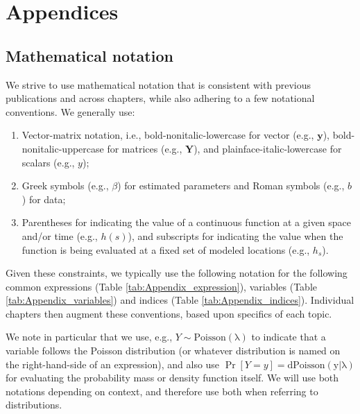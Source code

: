 \chapter{Appendices}

\section{Mathematical notation} \label{sec:notation}

We strive to use mathematical notation that is consistent with previous publications and across chapters, while also adhering to a few notational conventions.  We generally use:

\begin{enumerate}
    \item Vector-matrix notation, i.e., bold-nonitalic-lowercase for vector (e.g., \(\mathbf{y}\)), bold-nonitalic-uppercase for matrices (e.g., \(\mathbf{Y}\)), and plainface-italic-lowercase for scalars (e.g., \(y\));

    \item Greek symbols (e.g., \(\beta\)) for estimated parameters and Roman symbols (e.g., \(b\)) for data;

    \item Parentheses for indicating the value of a continuous function at a given space and/or time (e.g., \(h(s)\)), and subscripts for indicating the value when the function is being evaluated at a fixed set of modeled locations (e.g., \(h_s\)).
\end{enumerate}
Given these constraints, we typically use the following notation for the following common expressions (Table \ref{tab:Appendix_expression}), variables (Table \ref{tab:Appendix_variables}) and indices (Table \ref{tab:Appendix_indices}).  Individual chapters then augment these conventions, based upon specifics of each topic.  

We note in particular that we use, e.g., \(Y \sim \mathrm{Poisson(\lambda)} \) to indicate that a variable follows the Poisson distribution (or whatever distribution is named on the right-hand-side of an expression), and also use \(\Pr[Y=y] = \mathrm{dPoisson(y|\lambda)}\) for evaluating the probability mass or density function itself.  We will use both notations depending on context, and therefore use both when referring to distributions.   

